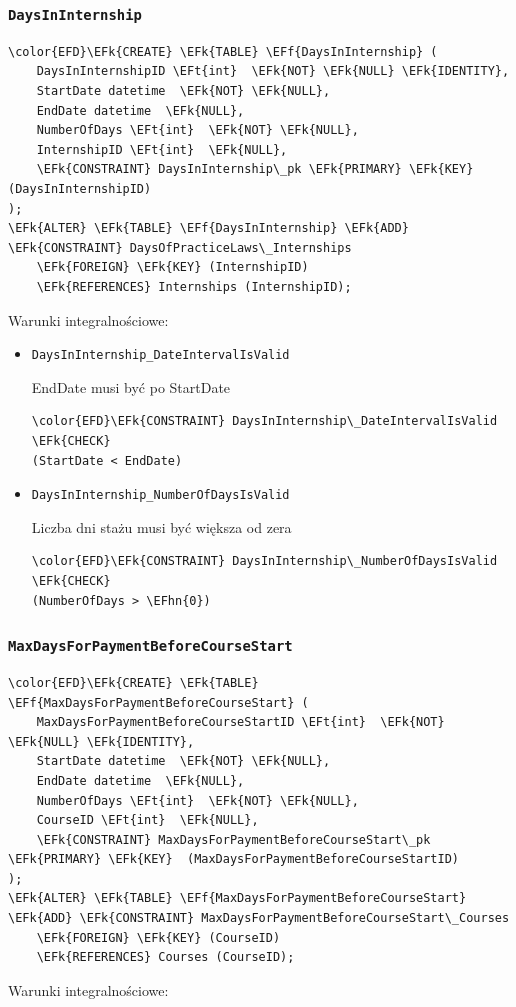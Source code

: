 \documentclass[11pt]{article}
\newcommand{\EFk}[1]{\textcolor{EFk}{\textbf{#1}}} %
\newcommand{\EFf}[1]{\textcolor{EFf}{#1}} %
\newcommand{\EFt}[1]{\textcolor{EFt}{\textbf{#1}}} %
\newcommand{\EFhn}[1]{\textcolor{EFhn}{#1}} %
\begin{document}
\subsubsection{\texttt{DaysInInternship}}
\label{sec:orgcbc647a}
\begin{Code}
\begin{Verbatim}
\color{EFD}\EFk{CREATE} \EFk{TABLE} \EFf{DaysInInternship} (
    DaysInInternshipID \EFt{int}  \EFk{NOT} \EFk{NULL} \EFk{IDENTITY},
    StartDate datetime  \EFk{NOT} \EFk{NULL},
    EndDate datetime  \EFk{NULL},
    NumberOfDays \EFt{int}  \EFk{NOT} \EFk{NULL},
    InternshipID \EFt{int}  \EFk{NULL},
    \EFk{CONSTRAINT} DaysInInternship\_pk \EFk{PRIMARY} \EFk{KEY}  (DaysInInternshipID)
);
\EFk{ALTER} \EFk{TABLE} \EFf{DaysInInternship} \EFk{ADD} \EFk{CONSTRAINT} DaysOfPracticeLaws\_Internships
    \EFk{FOREIGN} \EFk{KEY} (InternshipID)
    \EFk{REFERENCES} Internships (InternshipID);
\end{Verbatim}
\end{Code}
Warunki integralnościowe:


\begin{itemize}
\item \texttt{DaysInInternship\_DateIntervalIsValid}

EndDate musi być po StartDate
\begin{Code}
\begin{Verbatim}
\color{EFD}\EFk{CONSTRAINT} DaysInInternship\_DateIntervalIsValid \EFk{CHECK}
(StartDate < EndDate)
\end{Verbatim}
\end{Code}
\item \texttt{DaysInInternship\_NumberOfDaysIsValid}

Liczba dni stażu musi być większa od zera
\begin{Code}
\begin{Verbatim}
\color{EFD}\EFk{CONSTRAINT} DaysInInternship\_NumberOfDaysIsValid \EFk{CHECK}
(NumberOfDays > \EFhn{0})
\end{Verbatim}
\end{Code}
\end{itemize}
\subsubsection{\texttt{MaxDaysForPaymentBeforeCourseStart}}
\label{sec:orge781551}
\begin{Code}
\begin{Verbatim}
\color{EFD}\EFk{CREATE} \EFk{TABLE} \EFf{MaxDaysForPaymentBeforeCourseStart} (
    MaxDaysForPaymentBeforeCourseStartID \EFt{int}  \EFk{NOT} \EFk{NULL} \EFk{IDENTITY},
    StartDate datetime  \EFk{NOT} \EFk{NULL},
    EndDate datetime  \EFk{NULL},
    NumberOfDays \EFt{int}  \EFk{NOT} \EFk{NULL},
    CourseID \EFt{int}  \EFk{NULL},
    \EFk{CONSTRAINT} MaxDaysForPaymentBeforeCourseStart\_pk \EFk{PRIMARY} \EFk{KEY}  (MaxDaysForPaymentBeforeCourseStartID)
);
\EFk{ALTER} \EFk{TABLE} \EFf{MaxDaysForPaymentBeforeCourseStart} \EFk{ADD} \EFk{CONSTRAINT} MaxDaysForPaymentBeforeCourseStart\_Courses
    \EFk{FOREIGN} \EFk{KEY} (CourseID)
    \EFk{REFERENCES} Courses (CourseID);
\end{Verbatim}
\end{Code}
Warunki integralnościowe:
\end{document}
